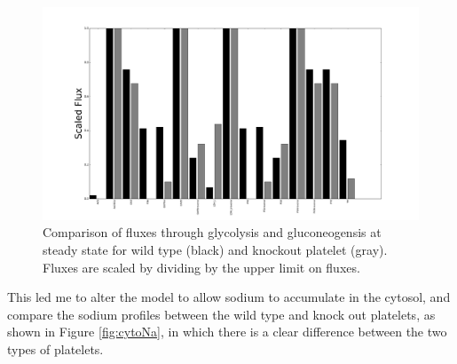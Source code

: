 \documentclass[11pt]{article}
\begin{document}
\begin{figure}
\centering
\hspace{-2cm}
\includegraphics[scale=.25]{../figures/barSSKnockouts[5742,5743]Glycolysis_Gluconeogenesis}
\caption{Comparison of fluxes through glycolysis and gluconeogensis at steady state for wild type (black) and knockout platelet (gray). Fluxes are scaled by dividing by the upper limit on fluxes.}
\label{fig:SSknockout}
\end{figure}
This led me to alter the model to allow sodium to accumulate in the cytosol, and compare the sodium profiles between the wild type and knock out platelets, as shown in Figure \ref{fig:cytoNa}, in which there is a clear difference between the two types of platelets. 


\clearpage


\end{document}
